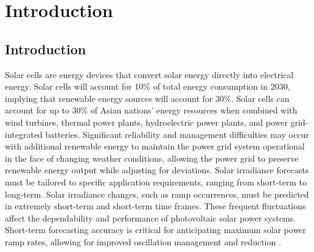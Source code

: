 
\chapter{Introduction} %

\label{c1} %


\section{Introduction}
Solar cells are energy devices that convert solar energy directly into electrical energy. Solar cells will account for 10\% of total energy consumption in 2030, implying that renewable energy sources will account for 30\%. Solar cells can account for up to 30\%  of Asian nations' energy resources when combined with wind turbines, thermal power plants, hydroelectric power plants, and power grid-integrated batteries. Significant reliability and management difficulties may occur with additional renewable energy to maintain the power grid system operational in the face of changing weather conditions, allowing the power grid to preserve renewable energy output while adjusting for deviations. Solar irradiance forecasts must be tailored to specific application requirements, ranging from short-term to long-term. Solar irradiance changes, such as ramp occurrences, must be predicted in extremely short-term and short-term time frames. These frequent fluctuations affect the dependability and performance of photovoltaic solar power systems. Short-term forecasting accuracy is critical for anticipating maximum solar power ramp rates, allowing for improved oscillation management and reduction \cite{brahma2020solar}.


